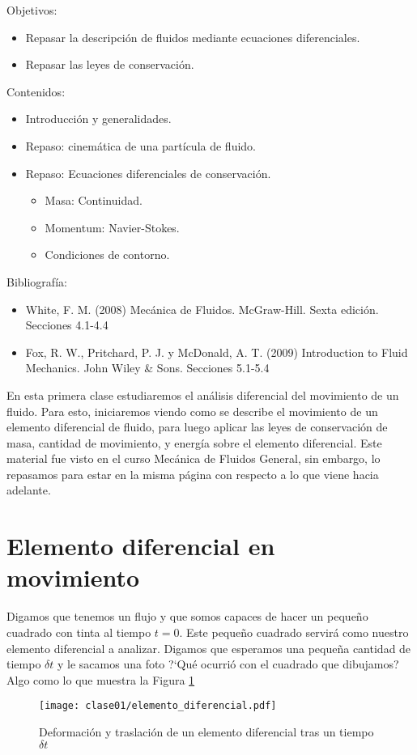 \begin{framed}

Objetivos:
\begin{itemize}
    \item Repasar la descripción de fluidos mediante ecuaciones diferenciales.
    \item Repasar las leyes de conservación.
\end{itemize}

Contenidos:
\begin{itemize}
    \item Introducción y generalidades.
    \item Repaso: cinemática de una partícula de fluido.
    \item Repaso: Ecuaciones diferenciales de conservación. 
    \begin{itemize}
        \item Masa: Continuidad.
        \item Momentum: Navier-Stokes.
        \item Condiciones de contorno.
    \end{itemize}
\end{itemize}

Bibliografía:
\begin{itemize}
    \item White, F. M. (2008) Mecánica de Fluidos. McGraw-Hill. Sexta edición. Secciones 4.1-4.4
    \item Fox, R. W., Pritchard, P. J. y McDonald, A. T. (2009) Introduction to Fluid Mechanics. John Wiley \& Sons. Secciones 5.1-5.4
\end{itemize}
\end{framed}

En esta primera clase estudiaremos el análisis diferencial del movimiento de un fluido. 
Para esto, iniciaremos viendo como se describe el movimiento de un elemento diferencial de fluido, para luego aplicar las leyes de conservación de masa, cantidad de movimiento, y energía sobre el elemento diferencial.
 Este material fue visto en el curso Mecánica de Fluidos General, sin embargo, lo repasamos para estar en la misma página con respecto a lo que viene hacia adelante.

\section*{Elemento diferencial en movimiento}
Digamos que tenemos un flujo y que somos capaces de hacer un pequeño cuadrado con tinta al tiempo $t=0$.
Este pequeño cuadrado servirá como nuestro elemento diferencial a analizar.
Digamos que esperamos una pequeña cantidad de tiempo $\delta t$ y le sacamos una foto \mbox{?`}Qué ocurrió con el cuadrado que dibujamos? Algo como lo que muestra la Figura \ref{fig:elemento_diferencial}
%
\begin{figure}[h!]
\centering
\texttt{[image: clase01/elemento\_diferencial.pdf]}
\caption{Deformación y traslación de un elemento diferencial tras un tiempo $\delta t$}
\label{fig:elemento_diferencial}
\end{figure}

